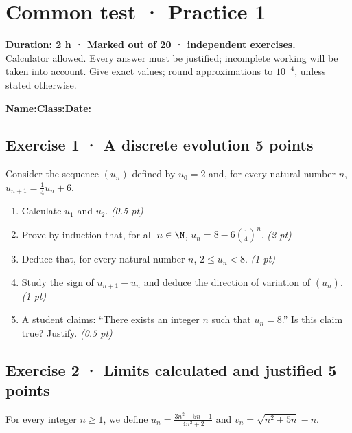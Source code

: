 \mxnewpage{}\label{sujet:3-1}

\section*{Common test · Practice 1}


\textbf{Duration: 2 h · Marked out of 20 ·  independent exercises.}\\Calculator allowed. Every answer must be justified; incomplete working will be taken into account. Give exact values; round approximations to $10^{-4}$, unless stated otherwise.

\smallskip\textbf{Name:}\enspace\dotfill\quad\textbf{Class:}\enspace\dotfill\quad\textbf{Date:}\enspace\dotfill

\subsection*{Exercise 1 · A discrete evolution \hfill 5 points}Consider the sequence $(u_n)$ defined by $u_0=2$ and, for every natural number $n$, $u_{n+1}=\frac{1}{4}u_n+6$.

\begin{enumerate}

\item Calculate $u_1$ and $u_2$. \hfill\textit{(0.5 pt)}

\item Prove by induction that, for all $n\in\N$, $u_n=8-6\left(\frac{1}{4}\right)^n$. \hfill\textit{(2 pt)}

\item Deduce that, for every natural number $n$, $2\le u_n<8$. \hfill\textit{(1 pt)}

\item Study the sign of $u_{n+1}-u_n$ and deduce the direction of variation of $(u_n)$. \hfill\textit{(1 pt)}

\item A student claims: ``There exists an integer $n$ such that $u_n=8$.'' Is this claim true? Justify. \hfill\textit{(0.5 pt)}

\end{enumerate}

\subsection*{Exercise 2 · Limits calculated and justified \hfill 5 points}For every integer $n\ge1$, we define $u_n=\frac{3n^2+5n-1}{4n^2+2}$ and $v_n=\sqrt{n^2+5n}-n$.

